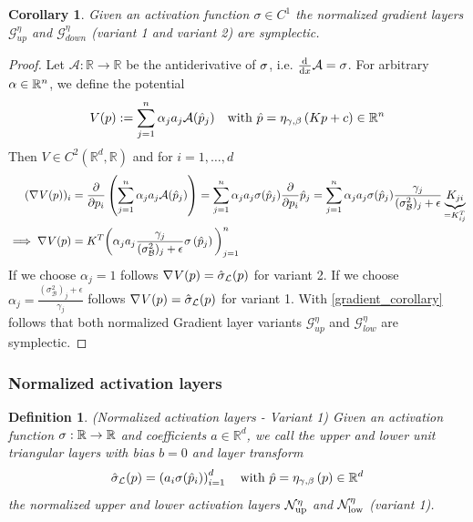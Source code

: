 \documentclass[twoside,a4paper]{article}
\newtheorem{definition}{Definition}
\newtheorem{corollary}{Corollary}
\begin{document}
\begin{corollary}\label{cor_norm_gradient_layers_symp}
	Given an activation function $\sigma \in C^1$
	the normalized gradient layers $\mathcal{G}^{\eta}_{up}$ and $\mathcal{G}^{\eta}_{down}$
	(variant 1 and variant 2) are symplectic.
\end{corollary}
\begin{proof}
	Let $\mathcal{A}: \mathbb{R} \to \mathbb{R}$ be the antiderivative of $\sigma$, 
	i.e. $\frac{\mathrm{d}^{}}{\mathrm{d}x} \mathcal{A} = \sigma$. For arbitrary $\alpha \in \mathbb{R}^n$, we define the potential
	\begin{equation*}
		V(p) := \sum_{j=1}^n \alpha_j a_j \mathcal{A}(\hat{p}_j)
		\quad \text{with } \hat{p} = \eta_{\gamma, \beta} \left( Kp + c \right) \in \mathbb{R}^n
	\end{equation*}
	Then $V \in C^2(\mathbb{R}^d, \mathbb{R})$ and for $i=1, \dots, d$
	\begin{align*}
		(\nabla_{}{V(p)})_i &= \frac{\partial }{\partial p_i} \left( \sum_{j=1}^n \alpha_j a_j \mathcal{A}(\hat{p}_j) \right)
		= \sum_{j=1}^n \alpha_j a_j \sigma(\hat{p}_j) \frac{\partial }{\partial p_i} \hat{p}_j
		= \sum_{j=1}^n \alpha_j a_j \sigma(\hat{p}_j)
		\frac{\gamma_j}{(\sigma^2_\mathcal{B})_j + \epsilon} \underbrace{K_{ji}}_{=K^T_{ij}} \\
		\implies
		\nabla_{}{V(p)}
		&= K^T \bigg( \alpha_j a_j \frac{\gamma_j}{(\sigma^2_\mathcal{B})_j + \epsilon}
		\sigma \left( \hat{p}_j \right) \bigg)_{j=1}^n
	\end{align*}
	If we choose $\alpha_j = 1$ follows $\nabla_{}{V(p)} = \hat{\sigma}_{\mathcal{L}}(p)$ for variant 2.
	If we choose $\alpha_j = \frac{(\sigma^2_\mathcal{B})_j + \epsilon}{\gamma_j}$ 
	follows $\nabla_{}{V(p)} = \hat{\sigma}_{\mathcal{L}}(p)$ for variant 1.
	With \cref{gradient_corollary} follows that both normalized Gradient layer variants
	$\mathcal{G}_{up}^\eta$ and $\mathcal{G}_{low}^\eta$ are symplectic.
\end{proof}


\subsubsection{Normalized activation layers}

\begin{definition}
	(Normalized activation layers - Variant 1)
	Given an activation function $\sigma : \mathbb{R} \to \mathbb{R}$ and coefficients $a \in \mathbb{R}^d$, 
	we call the upper and lower unit triangular layers with bias $b=0$ and layer transform
	\begin{equation*}
		\hat{\sigma}_{\mathcal{L}}(p) = \left( a_i \sigma(\hat{p}_i) \right)_{i=1}^d
		\quad \text{with } \hat{p} = \eta_{\gamma, \beta} \left( p \right) \in \mathbb{R}^d
	\end{equation*}
	the normalized upper and lower activation layers $\mathcal{N}_{\text{up}}^\eta$ and $\mathcal{N}_{\text{low}}^\eta$
	(variant 1).
\end{definition}
\end{document}

